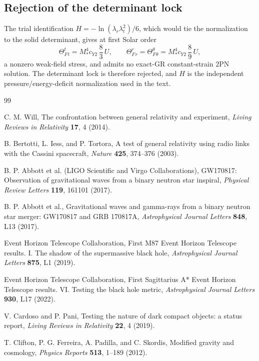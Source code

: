 \documentclass[12pt,a4paper]{article}
\begin{document}
\subsection*{Rejection of the determinant lock}

The trial identification $H=-\ln(\lambda_r\lambda_t^2)/6$, which would tie
the normalization to the solid determinant, gives at first Solar order
\[
\Theta_F^t{}_t=M_*^4c_{Y2}\,\frac{8}{3}\,U,\qquad
\Theta_F^r{}_r=\Theta_F^\theta{}_\theta=M_*^4c_{Y2}\,\frac{8}{9}\,U,
\]
a nonzero weak-field stress, and admits no exact-GR constant-strain $2$PN
solution. The determinant lock is therefore rejected, and $H$ is the
independent pressure/energy-deficit normalization used in the text.


\begin{thebibliography}{99}

C. M. Will, The confrontation between general relativity and experiment,
\textit{Living Reviews in Relativity} \textbf{17}, 4 (2014).

B. Bertotti, L. Iess, and P. Tortora, A test of general relativity using
radio links with the Cassini spacecraft, \textit{Nature} \textbf{425},
374--376 (2003).

B. P. Abbott et al. (LIGO Scientific and Virgo Collaborations), GW170817:
Observation of gravitational waves from a binary neutron star inspiral,
\textit{Physical Review Letters} \textbf{119}, 161101 (2017).

B. P. Abbott et al., Gravitational waves and gamma-rays from a binary
neutron star merger: GW170817 and GRB 170817A, \textit{Astrophysical
Journal Letters} \textbf{848}, L13 (2017).

Event Horizon Telescope Collaboration, First M87 Event Horizon Telescope
results. I. The shadow of the supermassive black hole,
\textit{Astrophysical Journal Letters} \textbf{875}, L1 (2019).

Event Horizon Telescope Collaboration, First Sagittarius A* Event Horizon
Telescope results. VI. Testing the black hole metric,
\textit{Astrophysical Journal Letters} \textbf{930}, L17 (2022).

V. Cardoso and P. Pani, Testing the nature of dark compact objects: a
status report, \textit{Living Reviews in Relativity} \textbf{22}, 4 (2019).

T. Clifton, P. G. Ferreira, A. Padilla, and C. Skordis, Modified gravity
and cosmology, \textit{Physics Reports} \textbf{513}, 1--189 (2012).


\end{thebibliography}
\end{document}
